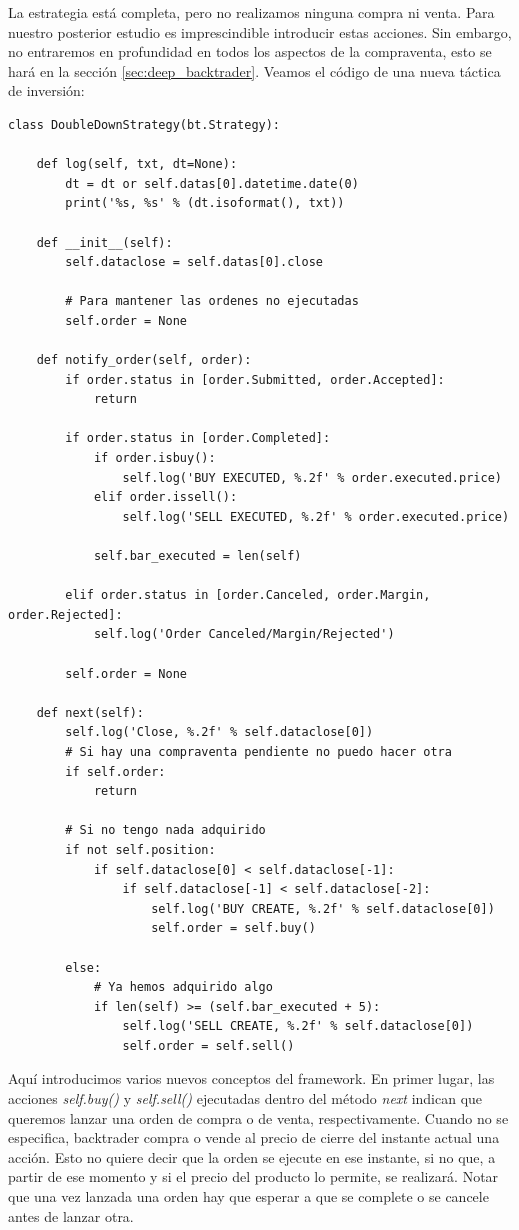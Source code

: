 \documentclass[12pt,a4paper]{article}
\begin{document}
		\vspace{0.4cm}
		
		La estrategia est\'a completa, pero no realizamos ninguna compra ni venta. Para nuestro posterior estudio es imprescindible introducir estas acciones. Sin embargo, no entraremos en profundidad en todos los aspectos de la compraventa, esto se har\'a en la secci\'on \ref{sec:deep_backtrader}. Veamos el c\'odigo de una nueva t\'actica de inversi\'on:
		
		
		\begin{lstlisting}[basicstyle=\tiny]
class DoubleDownStrategy(bt.Strategy):

	def log(self, txt, dt=None):
		dt = dt or self.datas[0].datetime.date(0)
		print('%s, %s' % (dt.isoformat(), txt))

	def __init__(self):
		self.dataclose = self.datas[0].close

		# Para mantener las ordenes no ejecutadas
		self.order = None

	def notify_order(self, order):
		if order.status in [order.Submitted, order.Accepted]:
			return

		if order.status in [order.Completed]:
			if order.isbuy():
				self.log('BUY EXECUTED, %.2f' % order.executed.price)
			elif order.issell():
				self.log('SELL EXECUTED, %.2f' % order.executed.price)

			self.bar_executed = len(self)

		elif order.status in [order.Canceled, order.Margin, order.Rejected]:
			self.log('Order Canceled/Margin/Rejected')

		self.order = None

	def next(self):
		self.log('Close, %.2f' % self.dataclose[0])
		# Si hay una compraventa pendiente no puedo hacer otra
		if self.order:
			return

		# Si no tengo nada adquirido
		if not self.position:
			if self.dataclose[0] < self.dataclose[-1]:
				if self.dataclose[-1] < self.dataclose[-2]:
					self.log('BUY CREATE, %.2f' % self.dataclose[0])
					self.order = self.buy()

		else:
			# Ya hemos adquirido algo
			if len(self) >= (self.bar_executed + 5):
				self.log('SELL CREATE, %.2f' % self.dataclose[0])
				self.order = self.sell()
		\end{lstlisting}
		
		Aqu\'i introducimos varios nuevos conceptos del framework. En primer lugar, las acciones \textit{self.buy()} y \textit{self.sell()} ejecutadas dentro del m\'etodo \textit{next} indican que queremos lanzar una orden de compra o de venta, respectivamente. Cuando no se especifica, backtrader compra o vende al precio de cierre del instante actual una acci\'on. Esto no quiere decir que la orden se ejecute en ese instante, si no que, a partir de ese momento y si el precio del producto lo permite, se realizar\'a. Notar que una vez lanzada una orden hay que esperar a que se complete o se cancele antes de lanzar otra.\\
		
\end{document}
